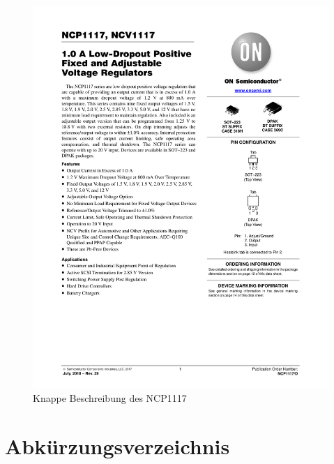 \begin{figure}[hb]
    \centering
    \includegraphics[scale=0.85,page=1]{fig/elektro/NCP1117-D.PDF}
    \caption{Knappe Beschreibung des NCP1117}
\end{figure}

\markboth{}{}    %

\printbibliography
\nocite{*}


\chapter{Abkürzungsverzeichnis}

